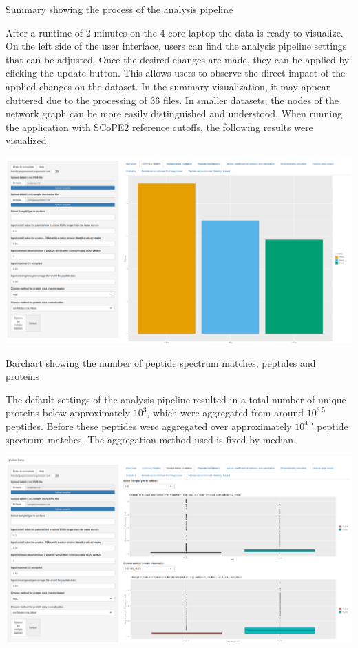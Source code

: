 \documentclass[
  11pt,
]{article}
\let\origfigure\figure
\begin{document}
\caption{Summary showing the process of the analysis pipeline}\label{fig:ui_summary}
 \endfigure\egroup

After a runtime of 2 minutes on the 4 core laptop the data is ready to
visualize. On the left side of the user interface, users can find the
analysis pipeline settings that can be adjusted. Once the desired
changes are made, they can be applied by clicking the update button.
This allows users to observe the direct impact of the applied changes on
the dataset. In the summary visualization, it may appear cluttered due
to the processing of 36 files. In smaller datasets, the nodes of the
network graph can be more easily distinguished and understood. When
running the application with SCoPE2 \citep{Specht2021} reference
cutoffs, the following results were visualized.

\newpage
\bgroup  \origfigure[H] 

{\centering \includegraphics[width=1\linewidth]{screenshots/numbers_default} 

}

\caption{Barchart showing the number of peptide spectrum matches, peptides and proteins}\label{fig:ui_numbers_default}
 \endfigure\egroup

The default settings of the analysis pipeline resulted in a total number
of unique proteins below approximately \(10^3\), which were aggregated
from around \(10^{3.5}\) peptides. Before these peptides were aggregated
over approximately \(10^{4.5}\) peptide spectrum matches. The
aggregation method used is fixed by median.

\newpage
\bgroup  \origfigure[H] 

{\centering \includegraphics[width=1\linewidth]{screenshots/mutual_info_default} 

}
\end{document}
